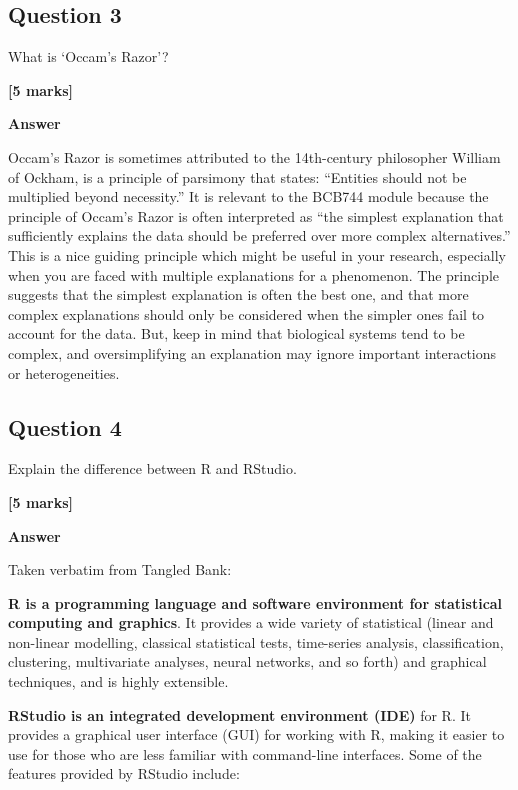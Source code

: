 \documentclass[
  10t,
]{article}
\begin{document}
\subsection{Question 3}\label{question-3}

What is `Occam's Razor'?

\textbf{{[}5 marks{]}}

\textbf{Answer}

Occam's Razor is sometimes attributed to the 14th-century philosopher
William of Ockham, is a principle of parsimony that states: ``Entities
should not be multiplied beyond necessity.'' It is relevant to the
BCB744 module because the principle of Occam's Razor is often
interpreted as ``the simplest explanation that sufficiently explains the
data should be preferred over more complex alternatives.'' This is a
nice guiding principle which might be useful in your research,
especially when you are faced with multiple explanations for a
phenomenon. The principle suggests that the simplest explanation is
often the best one, and that more complex explanations should only be
considered when the simpler ones fail to account for the data. But, keep
in mind that biological systems tend to be complex, and oversimplifying
an explanation may ignore important interactions or heterogeneities.

\subsection{Question 4}\label{question-4}

Explain the difference between R and RStudio.

\textbf{{[}5 marks{]}}

\textbf{Answer}

Taken verbatim from Tangled Bank:

\textbf{R is a programming language and software environment for
statistical computing and graphics}. It provides a wide variety of
statistical (linear and non-linear modelling, classical statistical
tests, time-series analysis, classification, clustering, multivariate
analyses, neural networks, and so forth) and graphical techniques, and
is highly extensible.

\textbf{RStudio is an integrated development environment (IDE)} for R.
It provides a graphical user interface (GUI) for working with R, making
it easier to use for those who are less familiar with command-line
interfaces. Some of the features provided by RStudio include:
\end{document}
